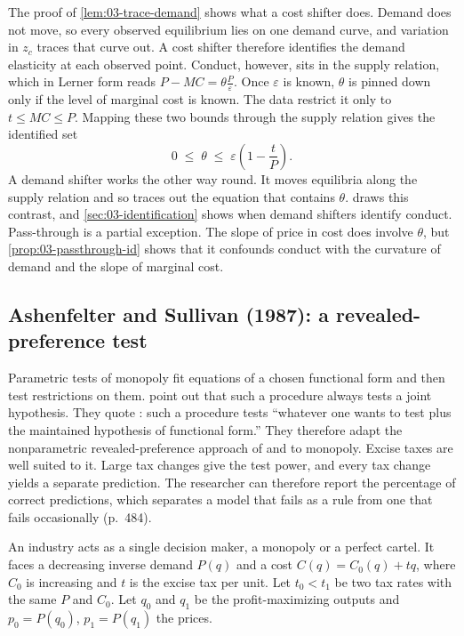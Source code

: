  The proof of \cref{lem:03-trace-demand} shows what a
cost shifter does. Demand does not move, so every observed equilibrium lies on one demand curve, and
variation in $z_c$ traces that curve out. A cost shifter therefore identifies the demand elasticity at each
observed point. Conduct, however, sits in the supply relation, which in Lerner form reads $P - MC =
\theta\frac{P}{\varepsilon}$. Once $\varepsilon$ is known, $\theta$ is pinned down only if the level of
marginal cost is known. The data restrict it only to $t \le MC \le P$. Mapping these two bounds through the
supply relation gives the identified set
\begin{equation}\label{eq:03-cost-identified-set}
  0 \;\le\; \theta \;\le\; \varepsilon\left(1 - \frac{t}{P}\right).
\end{equation}
A demand shifter works the other way round. It moves equilibria along the supply relation and so traces out
the equation that contains $\theta$. \citet[p.~1039]{Bresnahan1989} draws this contrast, and
\cref{sec:03-identification} shows when demand shifters identify conduct. Pass-through is a partial
exception. The slope of price in cost does involve $\theta$, but \cref{prop:03-passthrough-id} shows that it
confounds conduct with the curvature of demand and the slope of marginal cost.

\subsection{Ashenfelter and Sullivan (1987): a revealed-preference test}\label{sec:03-ashenfelter-sullivan}

 Parametric tests of monopoly fit equations of a chosen functional form and then test
restrictions on them. \citet{AshenfelterSullivan1987} point out that such a procedure always tests a joint
hypothesis. They quote \citet[p.~99]{Varian1983}: such a procedure tests ``whatever one wants to test plus
the maintained hypothesis of functional form.'' They therefore adapt the nonparametric
revealed-preference approach of \citet{Afriat1967} and \citet{Varian1982} to monopoly. Excise taxes are
well suited to it. Large tax changes give the test power, and every tax change yields a separate prediction.
The researcher can therefore report the percentage of correct predictions, which separates a model that
fails as a rule from one that fails occasionally (p.~484).

 An industry acts as a single decision maker, a monopoly or a perfect cartel. It faces a
decreasing inverse demand $P(q)$ and a cost $C(q) = C_0(q) + tq$, where $C_0$ is increasing and $t$ is the
excise tax per unit. Let $t_0 < t_1$ be two tax rates with the same $P$ and $C_0$. Let $q_0$ and $q_1$ be the
profit-maximizing outputs and $p_0 = P(q_0)$, $p_1 = P(q_1)$ the prices.

